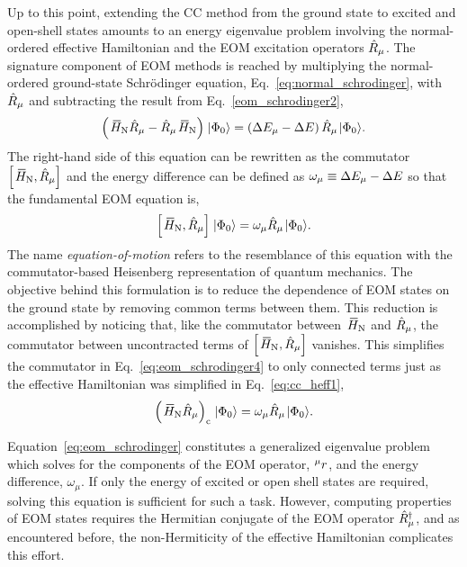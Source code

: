 \documentclass[thesis.tex]{subfiles}
\begin{document}
Up to this point, extending the CC method from the ground state to excited and open-shell states amounts to an energy eigenvalue problem involving the normal-ordered effective Hamiltonian and the EOM excitation operators $\hat{R}\hspace{-0.1pt}_{\mu}$.  The signature component of EOM methods is reached by multiplying the normal-ordered ground-state Schr\"odinger equation, Eq.\ \eqref{eq:normal_schrodinger}, with $\hat{R}\hspace{-0.1pt}_{\mu}$ and subtracting the result from Eq.\ \eqref{eom_schrodinger2},
\begin{equation} \label{eq:eom_schrodinger3}
  \left(\EHamN\Rop_{\mu} - \Rop_{\mu}\EHamN\right)\refket = \left(\Ecorr_{\mu} - \Ecorr\right)\Rop_{\mu}\refket.
\end{equation}
The right-hand side of this equation can be rewritten as the commutator $\left[ \EHamN,\Rop_{\mu} \right]$ and the energy difference can be defined as $\omega_{\mu} \equiv \Delta E_{\mu} - \Delta E$ so that the fundamental EOM equation is,
\begin{equation} \label{eq:eom_schrodinger4}
  \left[ \EHamN,\Rop_{\mu} \right]\refket = \omega_{\mu}\Rop_{\mu}\refket.
\end{equation}
The name \textit{equation-of-motion} refers to the resemblance of this equation with the commutator-based Heisenberg representation of quantum mechanics.  The objective behind this formulation is to reduce the dependence of EOM states on the ground state by removing common terms between them.  This reduction is accomplished by noticing that, like the commutator between $\EHamN$ and $\hat{R}\hspace{-0.1pt}_{\mu}$, the commutator between uncontracted terms of $\left[ \EHamN,\Rop_{\mu} \right]$ vanishes.  This simplifies the commutator in Eq.\ \eqref{eq:eom_schrodinger4} to only connected terms just as the effective Hamiltonian was simplified in Eq.\ \eqref{eq:cc_heff1},
\begin{equation} \label{eq:eom_schrodinger4}
  \left( \EHamN\Rop_{\mu} \right)_{\mathrm{c}}\refket = \omega_{\mu}\Rop_{\mu}\refket.
\end{equation}

Equation\ \eqref{eq:eom_schrodinger} constitutes a generalized eigenvalue problem which solves for the components of the EOM operator, ${}^{\mu}r^{}_{}$, and the energy difference, $\omega_{\mu}$.  If only the energy of excited or open shell states are required, solving this equation is sufficient for such a task.  However, computing properties of EOM states requires the Hermitian conjugate of the EOM operator $\hat{R}\hspace{-0.1pt}^{\dagger}_{\mu}$, and as encountered before, the non-Hermiticity of the effective Hamiltonian complicates this effort.
\end{document}
